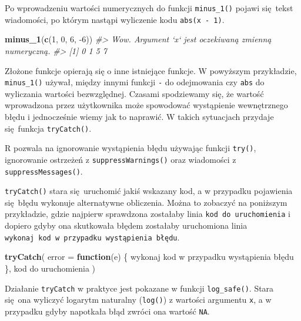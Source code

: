 \documentclass[paper=6in:9in,pagesize=pdftex,headinclude=on,footinclude=on,10pt]{scrbook}
\newenvironment{Shaded}{\begin{snugshade}}{\end{snugshade}}
\newcommand{\CommentTok}[1]{\textcolor[rgb]{0.56,0.35,0.01}{\textit{#1}}}
\newcommand{\ControlFlowTok}[1]{\textcolor[rgb]{0.13,0.29,0.53}{\textbf{#1}}}
\newcommand{\DataTypeTok}[1]{\textcolor[rgb]{0.13,0.29,0.53}{#1}}
\newcommand{\DecValTok}[1]{\textcolor[rgb]{0.00,0.00,0.81}{#1}}
\newcommand{\KeywordTok}[1]{\textcolor[rgb]{0.13,0.29,0.53}{\textbf{#1}}}
\newcommand{\NormalTok}[1]{#1}
\let\BeginKnitrBlock\begin \let\EndKnitrBlock\end
\begin{document}
Po wprowadzeniu wartości numerycznych do funkcji \texttt{minus\_1()} pojawi się~tekst wiadomości, po którym nastąpi wyliczenie kodu \texttt{abs(x\ -\ 1)}.

\begin{Shaded}
\begin{Highlighting}[]
\KeywordTok{minus_1}\NormalTok{(}\KeywordTok{c}\NormalTok{(}\DecValTok{1}\NormalTok{, }\DecValTok{0}\NormalTok{, }\DecValTok{6}\NormalTok{, }\DecValTok{-6}\NormalTok{))}
\CommentTok{#> Wow. Argument `x` jest oczekiwaną zmienną numeryczną.}
\CommentTok{#> [1] 0 1 5 7}
\end{Highlighting}
\end{Shaded}

Złożone funkcje opierają się o inne istniejące funkcje.
W powyższym przykładzie, \texttt{minus\_1()} używał, między innymi funkcji \texttt{-} do odejmowania czy \texttt{abs} do wyliczania wartości bezwzględnej.
Czasami spodziewamy się, że wartość wprowadzona przez użytkownika może spowodować wystąpienie wewnętrznego błędu i jednocześnie wiemy jak to naprawić.
W takich sytuacjach przydaje się~funkcja \texttt{tryCatch()}.

\BeginKnitrBlock{rmdinfo}
R pozwala na ignorowanie wystąpienia błędu używając funkcji \texttt{try()}, ignorowanie ostrzeżeń z \texttt{suppressWarnings()} oraz wiadomości z \texttt{suppressMessages()}.
\EndKnitrBlock{rmdinfo}

\texttt{tryCatch()} stara się~uruchomić jakiś wskazany kod, a w przypadku pojawienia się~błędu wykonuje alternatywne obliczenia.
Można to zobaczyć na poniższym przykładzie, gdzie najpierw sprawdzona zostałaby linia \texttt{kod\ do\ uruchomienia} i dopiero gdyby ona skutkowała błędem zostałaby uruchomiona linia \texttt{wykonaj\ kod\ w\ przypadku\ wystąpienia\ błędu}.

\begin{Shaded}
\begin{Highlighting}[]
\KeywordTok{tryCatch}\NormalTok{(}
  \DataTypeTok{error =} \ControlFlowTok{function}\NormalTok{(e) \{}
\NormalTok{    wykonaj kod w przypadku wystąpienia błędu}
\NormalTok{  \},}
\NormalTok{  kod do uruchomienia }
\NormalTok{)}
\end{Highlighting}
\end{Shaded}

Działanie \texttt{tryCatch} w praktyce jest pokazane w funkcji \texttt{log\_safe()}.
Stara się~ona wyliczyć logarytm naturalny (\texttt{log()}) z wartości argumentu \texttt{x}, a w przypadku gdyby napotkała błąd zwróci ona wartość \texttt{NA}.
\end{document}
